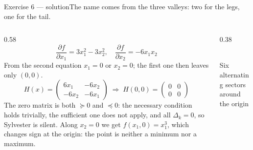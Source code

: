 \documentclass[aspectratio=169,11pt]{beamer}
\begin{document}
\begin{frame}{Exercise 6 --- solution}{The name comes from the three valleys: two for the legs, one for the tail.}
  \vspace{0.1em}
  \begin{columns}[T,onlytextwidth]
    \begin{column}{0.58\textwidth}
      {\small
        \[ \frac{\partial f}{\partial x_1}=3x_1^{2}-3x_2^{2},\quad
          \frac{\partial f}{\partial x_2}=-6x_1x_2 \]
        From the second equation $x_1=0$ or $x_2=0$; the first one then leaves only $(0,0)$.
        \[ H(x)=\begin{pmatrix}6x_1&-6x_2\\-6x_2&-6x_1\end{pmatrix}
          \;\Rightarrow\; H(0,0)=\begin{pmatrix}0&0\\0&0\end{pmatrix} \]
        The zero matrix is both $\succeq 0$ and $\preceq 0$: the necessary condition holds trivially, the
        sufficient one does not apply, and all $\Delta_k=0$, so Sylvester is silent.
        Along $x_2=0$ we get $f(x_1,0)=x_1^{3}$, which changes sign at the origin: the point is
        neither a minimum nor a maximum.}
    \end{column}
    \begin{column}{0.38\textwidth}\centering
      \\[0.4em]
      {\scriptsize Six alternating sectors around the origin}
    \end{column}
  \end{columns}
\end{frame}
\end{document}
